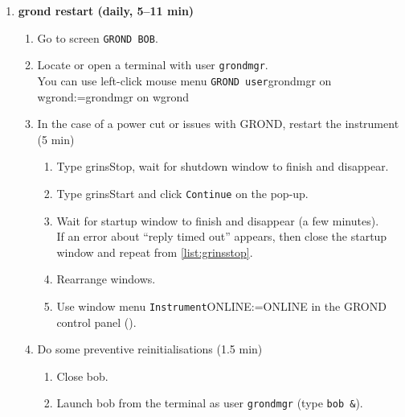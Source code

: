 \documentclass[11pt,fleqn,a4paper]{book}
\makeatletter
\def\menu#1#2{\texttt{#1}\ifx{}#2\else\@for\@x:=#2\do{$\rightarrow$\texttt{\@x}}\fi}
\def\wmenu#1#2{window menu \menu{#1}{#2}}
\def\mmenu#1#2{left-click mouse menu \menu{#1}{#2}}
\makeatother
\begin{document}
\begin{enumerate}
\begin{enumerate}
\begin{enumerate}
\begin{enumerate}
              \item Click \texttt{OK} on the error popups, one should say \texttt{error closing \gls{w2p2cam}}
              \item In \gls{bob}, click on \texttt{Reset status}
              \item Re-run it (point \ref{list:ferostestob}).
            \end{enumerate}
            \item \texttt{FEROS \gls{General State}} panel, select \wmenu{Telescope}{IGNORE}
           \end{enumerate}
        \end{enumerate}
  \item \textbf{\gls{grond} restart (daily, 5--11 min)}
        \label{list:grond}
        \begin{enumerate}
         \item Go to screen \texttt{GROND BOB}.
         \item Locate or open a terminal with user \texttt{grondmgr}.\\
               You can use \mmenu{GROND user}{grondmgr on \gls{wgrond}}
         \item In the case of a power cut or issues with GROND, restart the instrument (5 min)
         \begin{enumerate}
           \item Type \gls{grinsStop}, wait for shutdown window to finish and disappear.\label{list:grinsstop}
            \item Type \gls{grinsStart} and click \texttt{Continue} on the pop-up.
            \item Wait for startup window to finish and disappear (a few minutes).\\If an error about ``reply timed out'' appears, then close the startup window and repeat from \ref{list:grinsstop}.\label{list:grinsstart}
            \item Rearrange windows.
            \item Use \wmenu{Instrument}{ONLINE} in the GROND control panel ().\label{list:grondonline}
         \end{enumerate}
         \item Do some preventive reinitialisations (1.5 min)\label{list:grond-prophylaxis}
           \begin{enumerate}
             \item Close \gls{bob}.
             \item Launch \gls{bob} from the terminal as user \texttt{grondmgr} (type \texttt{bob \&}).

\end{enumerate}
\end{enumerate}
\end{enumerate}
\end{document}
